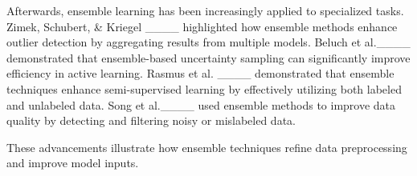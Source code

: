 Afterwards, ensemble learning has been increasingly applied to specialized tasks. Zimek, Schubert, \& Kriegel ____  highlighted how ensemble methods enhance outlier detection by aggregating results from multiple models. Beluch et al.____ demonstrated that ensemble-based uncertainty sampling can significantly improve efficiency in active learning. Rasmus et al. ____ demonstrated that ensemble techniques enhance semi-supervised learning by effectively utilizing both labeled and unlabeled data. Song et al.____ used ensemble methods to improve data quality by detecting and filtering noisy or mislabeled data.

These advancements illustrate how ensemble techniques refine data preprocessing and improve model inputs.